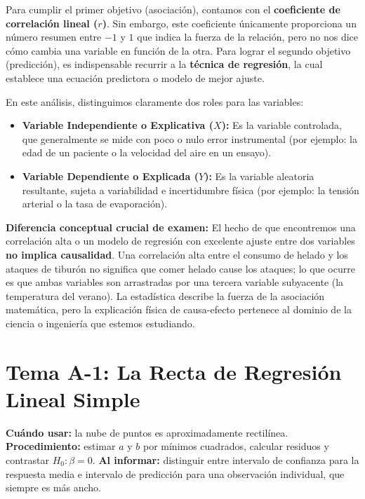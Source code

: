 \documentclass[11pt,a4paper]{article}
\begin{document}
Para cumplir el primer objetivo (asociación), contamos con el \textbf{coeficiente de correlación lineal ($r$)}. Sin embargo, este coeficiente únicamente proporciona un número resumen entre $-1$ y $1$ que indica la fuerza de la relación, pero no nos dice cómo cambia una variable en función de la otra. Para lograr el segundo objetivo (predicción), es indispensable recurrir a la \textbf{técnica de regresión}, la cual establece una ecuación predictora o modelo de mejor ajuste.

En este análisis, distinguimos claramente dos roles para las variables:
\begin{itemize}
    \item \textbf{Variable Independiente o Explicativa ($X$):} Es la variable controlada, que generalmente se mide con poco o nulo error instrumental (por ejemplo: la edad de un paciente o la velocidad del aire en un ensayo).
    \item \textbf{Variable Dependiente o Explicada ($Y$):} Es la variable aleatoria resultante, sujeta a variabilidad e incertidumbre física (por ejemplo: la tensión arterial o la tasa de evaporación).
\end{itemize}

\begin{importante}
    \textbf{Diferencia conceptual crucial de examen:} El hecho de que encontremos una correlación alta o un modelo de regresión con excelente ajuste entre dos variables \textbf{no implica causalidad}. Una correlación alta entre el consumo de helado y los ataques de tiburón no significa que comer helado cause los ataques; lo que ocurre es que ambas variables son arrastradas por una tercera variable subyacente (la temperatura del verano). La estadística describe la fuerza de la asociación matemática, pero la explicación física de causa-efecto pertenece al dominio de la ciencia o ingeniería que estemos estudiando.
\end{importante}

\newpage
\section{Tema A-1: La Recta de Regresión Lineal Simple}

\begin{ruta}
\textbf{Cuándo usar:} la nube de puntos es aproximadamente rectilínea. \textbf{Procedimiento:} estimar $a$ y $b$ por mínimos cuadrados, calcular residuos y contrastar $H_0:\beta=0$. \textbf{Al informar:} distinguir entre intervalo de confianza para la respuesta media e intervalo de predicción para una observación individual, que siempre es más ancho.
\end{ruta}
\end{document}

